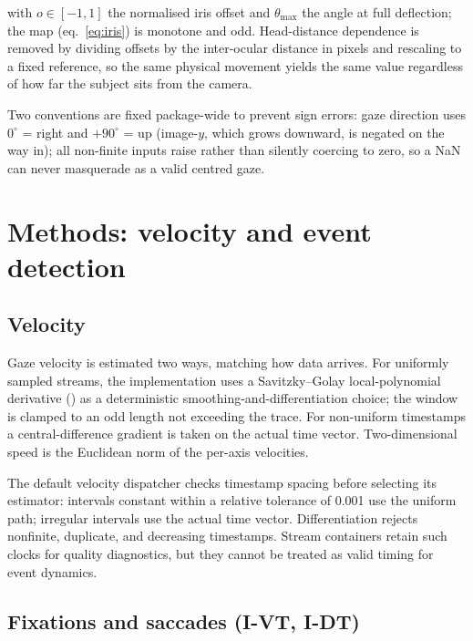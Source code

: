 \documentclass[
]{article}
\begin{document}
with \(o \in [-1, 1]\) the normalised iris offset and \(\theta_{\max}\)
the angle at full deflection; the map (eq.~\ref{eq:iris}) is monotone
and odd. Head-distance dependence is removed by dividing offsets by the
inter-ocular distance in pixels and rescaling to a fixed reference, so
the same physical movement yields the same value regardless of how far
the subject sits from the camera.

Two conventions are fixed package-wide to prevent sign errors: gaze
direction uses \(0^\circ\) = right and \(+90^\circ\) = up (image-\(y\),
which grows downward, is negated on the way in); all non-finite inputs
raise rather than silently coercing to zero, so a NaN can never
masquerade as a valid centred gaze.

\section{Methods: velocity and event detection}\label{sec:events}

\subsection{Velocity}\label{velocity}

Gaze velocity is estimated two ways, matching how data arrives. For
uniformly sampled streams, the implementation uses a Savitzky--Golay
local-polynomial derivative
() as a
deterministic smoothing-and-differentiation choice; the window is
clamped to an odd length not exceeding the trace. For non-uniform
timestamps a central-difference gradient is taken on the actual time
vector. Two-dimensional speed is the Euclidean norm of the per-axis
velocities.

The default velocity dispatcher checks timestamp spacing before
selecting its estimator: intervals constant within a relative tolerance
of 0.001 use the uniform path; irregular intervals use the actual time
vector. Differentiation rejects nonfinite, duplicate, and decreasing
timestamps. Stream containers retain such clocks for quality
diagnostics, but they cannot be treated as valid timing for event
dynamics.

\subsection{Fixations and saccades (I-VT,
I-DT)}\label{fixations-and-saccades-i-vt-i-dt}
\end{document}
